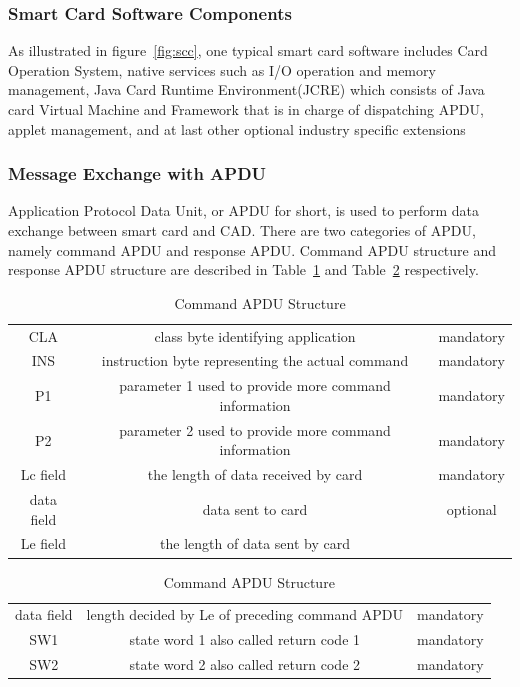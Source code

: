 \documentclass[]{llncs}
\begin{document}
\subsubsection{Smart Card Software Components}
As illustrated in figure~\ref{fig:scc}, one typical smart card software includes Card Operation System, native services such as I/O operation and memory management, Java Card Runtime Environment(JCRE) which consists of Java card  Virtual Machine and Framework that is in charge of dispatching APDU, applet management, and at last other optional industry specific extensions\cite{jcadg}



\subsubsection{Message Exchange with APDU}
Application Protocol Data Unit, or APDU for short, is used  to perform data exchange between smart card and CAD. There are two categories of APDU, namely command APDU and response APDU. Command APDU structure and response APDU structure are described in Table~\ref{table:capdu} and Table~\ref{table:rapdu} respectively\cite{handbuch}. 

\begin{table}[!htbp]
\caption{Command APDU Structure}
\centering
\begin{tabular}{ c c c}
\hline\hline
 CLA &class byte identifying application  & mandatory \\[0.5ex]
 INS &instruction byte representing the actual command  & mandatory \\
 P1 &parameter 1 used to provide more command information & mandatory \\
 P2 &parameter 2 used to provide more command information& mandatory \\
 Lc field &the length of data received by card & mandatory \\
 data field &data sent to card& optional \\
Le field &the length of data sent by card \\
\hline
\end{tabular}
\label{table:capdu}
\end{table}

\begin{table}[ht]
\caption{Command APDU Structure}
\centering
\begin{tabular}{ c c c}
\hline\hline
 data field & length decided by Le of preceding command  APDU  & mandatory \\[0.5ex]
 SW1 &state word 1 also called return code 1  & mandatory \\
 SW2 &state word 2 also called return code 2& mandatory \\
\hline
\end{tabular}
\label{table:rapdu}
\end{table}
\end{document}
